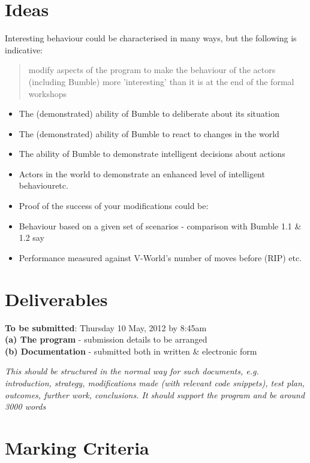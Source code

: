 \documentclass[a4paper,oneside]{report}
\begin{document}
\section{Ideas}

Interesting behaviour could be characterised in many ways, but the following is indicative: \begin{quotation}modify aspects of the program to make the behaviour of the actors (including Bumble) more ’interesting’ than it is at the end of the formal workshops\end{quotation}


\begin{itemize}
\item The (demonstrated) ability of Bumble to deliberate about its situation
\item The (demonstrated) ability of Bumble to react to changes in the world
\item The ability of Bumble to demonstrate intelligent decisions about actions
\item Actors in the world to demonstrate an enhanced level of intelligent behaviouretc.
\item Proof of the success of your modifications could be:
\item Behaviour based on a given set of scenarios - comparison with Bumble 1.1 \& 1.2 say
\item Performance measured against V-World's number of moves before (RIP)
etc.
\end{itemize}

\section{Deliverables}

\textbf{To be submitted}: Thursday 10 May, 2012 by 8:45am\\

\noindent \textbf{(a) The program} - submission details to be arranged\\
\textbf{(b) Documentation} - submitted both in written \& electronic form

\emph{This should be structured in the normal way for such documents, e.g.  introduction, strategy, modifications made (with relevant code snippets), test plan, outcomes, further work, conclusions. It should support the program and be around 3000 words}

\section{Marking Criteria}
\end{document}
